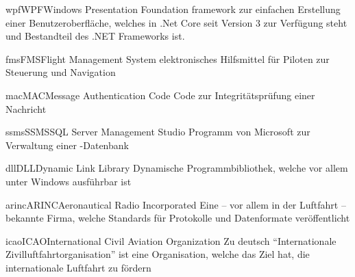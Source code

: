 \newdefineabbreviation
{wpf}{WPF}{Windows Presentation Foundation}
{\gls{framework} zur einfachen Erstellung einer Benutzeroberfläche,
	welches in .Net Core seit Version 3 zur Verfügung steht
	und Bestandteil des .NET Frameworks ist.}

\newdefineabbreviation
{fms}{FMS}{Flight Management System}
{elektronisches Hilfsmittel für Piloten zur Steuerung und Navigation}

\newdefineabbreviation
{mac}{MAC}{Message Authentication Code}
{Code zur Integritätsprüfung einer Nachricht}

\newdefineabbreviation
{ssms}{SSMS}{SQL Server Management Studio}
{Programm von Microsoft zur Verwaltung einer -Datenbank}

\newdefineabbreviation
{dll}{DLL}{Dynamic Link Library}
{Dynamische Programmbibliothek, welche vor allem unter Windows ausführbar ist}

\newdefineabbreviation
{arinc}{ARINC}{Aeronautical Radio Incorporated}
{Eine -- vor allem in der Luftfahrt -- bekannte Firma,
	welche Standards für Protokolle und Datenformate veröffentlicht}

\newdefineabbreviation
{icao}{ICAO}{International Civil Aviation Organization}
{Zu deutsch \enquote{Internationale Zivilluftfahrtorganisation} ist eine Organisation,
	welche das Ziel hat, die internationale Luftfahrt zu fördern}







